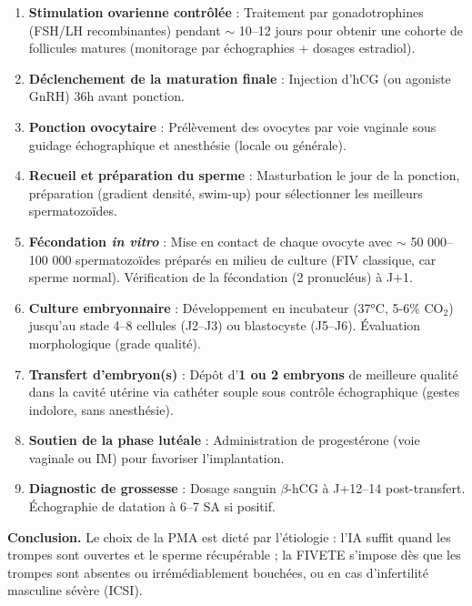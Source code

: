 \documentclass[11pt]{article}
\newcounter{popsec}
\newcounter{popsub}
\newcommand{\courssub}[1]{%
  \stepcounter{popsub}%
  \par\vspace{9pt}\noindent{\popxbold\fontsize{11.5}{13}\selectfont\color{popink}{\color{poporange}\thepopsec.\thepopsub}\hspace{6pt}#1}\par\nopagebreak\vspace{4pt}
}
\begin{document}
\begin{exoresolu}
\begin{enumerate}
\begin{enumerate}
\item \textbf{Stimulation ovarienne contrôlée} : Traitement par gonadotrophines (FSH/LH recombinantes) pendant $\sim$ 10--12 jours pour obtenir une cohorte de follicules matures (monitorage par échographies + dosages estradiol).
\item \textbf{Déclenchement de la maturation finale} : Injection d'hCG (ou agoniste GnRH) 36h avant ponction.
\item \textbf{Ponction ovocytaire} : Prélèvement des ovocytes par voie vaginale sous guidage échographique et anesthésie (locale ou générale).
\item \textbf{Recueil et préparation du sperme} : Masturbation le jour de la ponction, préparation (gradient densité, swim-up) pour sélectionner les meilleurs spermatozoïdes.
\item \textbf{Fécondation \emph{in vitro}} : Mise en contact de chaque ovocyte avec $\sim$ 50 000--100 000 spermatozoïdes préparés en milieu de culture (FIV classique, car sperme normal). Vérification de la fécondation (2 pronucléus) à J+1.
\item \textbf{Culture embryonnaire} : Développement en incubateur (37°C, 5-6\% CO$_2$) jusqu'au stade 4--8 cellules (J2--J3) ou blastocyste (J5--J6). Évaluation morphologique (grade qualité).
\item \textbf{Transfert d'embryon(s)} : Dépôt d'\textbf{1 ou 2 embryons} de meilleure qualité dans la cavité utérine via cathéter souple sous contrôle échographique (gestes indolore, sans anesthésie).
\item \textbf{Soutien de la phase lutéale} : Administration de progestérone (voie vaginale ou IM) pour favoriser l'implantation.
\item \textbf{Diagnostic de grossesse} : Dosage sanguin $\beta$-hCG à J+12--14 post-transfert. Échographie de datation à 6--7 SA si positif.
\end{enumerate}
\end{enumerate}
\textbf{Conclusion.} Le choix de la PMA est dicté par l'étiologie : l'IA suffit quand les trompes sont ouvertes et le sperme récupérable ; la FIVETE s'impose dès que les trompes sont absentes ou irrémédiablement bouchées, ou en cas d'infertilité masculine sévère (ICSI).
\end{exoresolu}

\courssub{Enjeux éthiques de la PMA}
\end{document}
